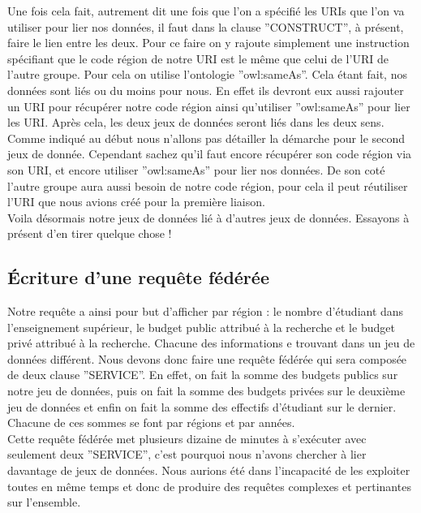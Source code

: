 \documentclass[a4paper,sffamily,12pt]{article}
\begin{document}
			\indent Une fois cela fait, autrement dit une fois que l'on a spécifié les URIs que l'on va utiliser pour lier nos données, il faut dans la clause ''CONSTRUCT'', à présent, faire le lien entre les deux. Pour ce faire on y rajoute simplement une instruction spécifiant que le code région de notre URI est le même que celui de l'URI de l'autre groupe. Pour cela on utilise l'ontologie ''owl:sameAs''. Cela étant fait, nos données sont liés ou du moins pour nous. En effet ils devront eux aussi rajouter un URI pour récupérer notre code région  ainsi qu'utiliser ''owl:sameAs'' pour lier les URI. Après cela, les deux jeux de données seront liés dans les deux sens. \\
			
			\indent Comme indiqué au début nous n'allons pas détailler la démarche pour le second jeux de donnée. Cependant sachez qu'il faut encore récupérer son code région via son URI, et encore utiliser ''owl:sameAs'' pour lier nos données. De son coté l'autre groupe aura aussi besoin de notre code région, pour cela il peut réutiliser l'URI que nous avions créé pour la première liaison. \\
			
			\indent Voila désormais notre jeux de données lié à d'autres jeux de données. Essayons à présent d'en tirer quelque chose !
						
			\vspace{0.5cm}
			
		\subsection{Écriture d'une requête fédérée}
			
			\vspace{0.5cm}
			
			Notre requête a ainsi pour but d'afficher par région : le nombre d'étudiant dans l'enseignement supérieur, le budget public attribué à la recherche et le budget privé attribué à la recherche. Chacune des informations e trouvant dans un jeu de données différent. Nous devons donc faire une requête fédérée qui sera composée de deux clause ''SERVICE''. En effet, on fait la somme des budgets publics sur notre jeu de données, puis on fait la somme des budgets privées sur le deuxième jeu de données et enfin on fait la somme des effectifs d'étudiant sur le dernier. Chacune de ces sommes se font par régions et par années. \\
			
			\indent Cette requête fédérée met plusieurs dizaine de minutes à s'exécuter avec seulement deux ''SERVICE'', c'est pourquoi nous n'avons chercher à lier davantage de jeux de données. Nous aurions été dans l'incapacité de les exploiter toutes en même temps et donc de produire des requêtes complexes et pertinantes sur l'ensemble.
\end{document}
